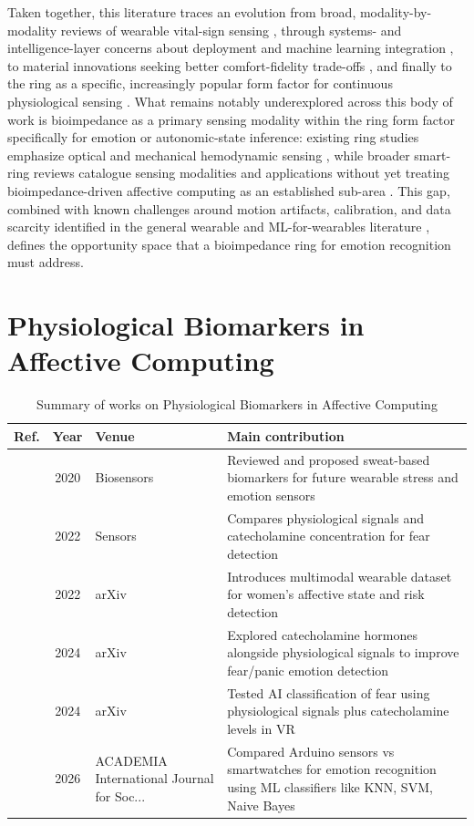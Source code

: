 Taken together, this literature traces an evolution from broad, modality-by-modality reviews of wearable vital-sign sensing \cite{yilmaz2010detecting,dias2018wearable}, through systems- and intelligence-layer concerns about deployment and machine learning integration \cite{sabry2022machine,he2023smart}, to material innovations seeking better comfort-fidelity trade-offs \cite{mayoral2021fiber,li2023advanced}, and finally to the ring as a specific, increasingly popular form factor for continuous physiological sensing \cite{lindstrom2025wearable,wang2025computing}. What remains notably underexplored across this body of work is bioimpedance as a primary sensing modality within the ring form factor specifically for emotion or autonomic-state inference: existing ring studies emphasize optical and mechanical hemodynamic sensing \cite{lindstrom2025wearable}, while broader smart-ring reviews catalogue sensing modalities and applications without yet treating bioimpedance-driven affective computing as an established sub-area \cite{wang2025computing}. This gap, combined with known challenges around motion artifacts, calibration, and data scarcity identified in the general wearable and ML-for-wearables literature \cite{sabry2022machine,dias2018wearable}, defines the opportunity space that a bioimpedance ring for emotion recognition must address.

\section{Physiological Biomarkers in Affective Computing}\label{sec:theme5}
\begin{table}[!t]
\centering
\renewcommand{\arraystretch}{1.2}
\caption{Summary of works on Physiological Biomarkers in Affective Computing}\label{tab:theme5}
\begin{tabularx}{\textwidth}{@{}l c p{3.6cm} X@{}}
\toprule
\textbf{Ref.} & \textbf{Year} & \textbf{Venue} & \textbf{Main contribution} \\
\midrule
\cite{zamkah2020identification} & 2020 & Biosensors & Reviewed and proposed sweat-based biomarkers for future wearable stress and emotion sensors \\
\cite{gutierrezmartin2022fear} & 2022 & Sensors & Compares physiological signals and catecholamine concentration for fear detection \\
\cite{a2022wemac} & 2022 & arXiv & Introduces multimodal wearable dataset for women's affective state and risk detection \\
\cite{qu2024advancing} & 2024 & arXiv & Explored catecholamine hormones alongside physiological signals to improve fear/panic emotion detection \\
\cite{qu2024student} & 2024 & arXiv & Tested AI classification of fear using physiological signals plus catecholamine levels in VR \\
\cite{shahid2026comparative} & 2026 & ACADEMIA International Journal for Soc... & Compared Arduino sensors vs smartwatches for emotion recognition using ML classifiers like KNN, SVM, Naive Bayes \\
\bottomrule
\end{tabularx}
\end{table}

